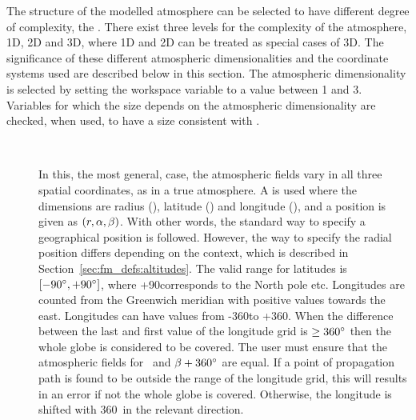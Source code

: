 \label{sec:fm_defs:atmdim}

The structure of the modelled atmosphere can be selected to have different
degree of complexity, the . There
exist three levels for the complexity of the atmosphere, 1D, 2D and
3D, where 1D and 2D can be treated as special cases of 3D. The
significance of these different atmospheric dimensionalities and the
coordinate systems used are described below in this section. The
atmospheric dimensionality is selected by setting the workspace
variable  to a value between 1 and 3. Variables
for which the size depends on the atmospheric dimensionality are
checked, when used, to have a size consistent with
.

\begin{description}
  
\item[\,\,\,] In this, the most general, case, the
  atmospheric fields vary in all three spatial coordinates, as in a
  true atmosphere. A  is used where the
  dimensions are radius (\Rds), latitude (\Lat) and longitude (\Lon),
  and a position is given as $(r,\alpha,\beta)$. With other words, the
  standard way to specify a geographical position is followed.
  However, the way to specify the radial position differs depending on
  the context, which is described in
  Section~\ref{sec:fm_defs:altitudes}. The valid range for latitudes
  is $[-90^\circ,+90^\circ]$, where +90\degree corresponds to the
  North pole etc. Longitudes are counted from the Greenwich meridian
  with positive values towards the east. Longitudes can have values
  from -360\degree to +360\degree. When the difference between the
  last and first value of the longitude grid is $\geq 360^\circ$ then
  the whole globe is considered to be covered. The user must ensure
  that the atmospheric fields for \Lon\ and $\beta+360^\circ$ are
  equal. If a point of propagation path is found to be outside the
  range of the longitude grid, this will results in an error if not
  the whole globe is covered. Otherwise, the longitude is shifted with
  360\degree\ in the relevant direction.
  

\end{description}
